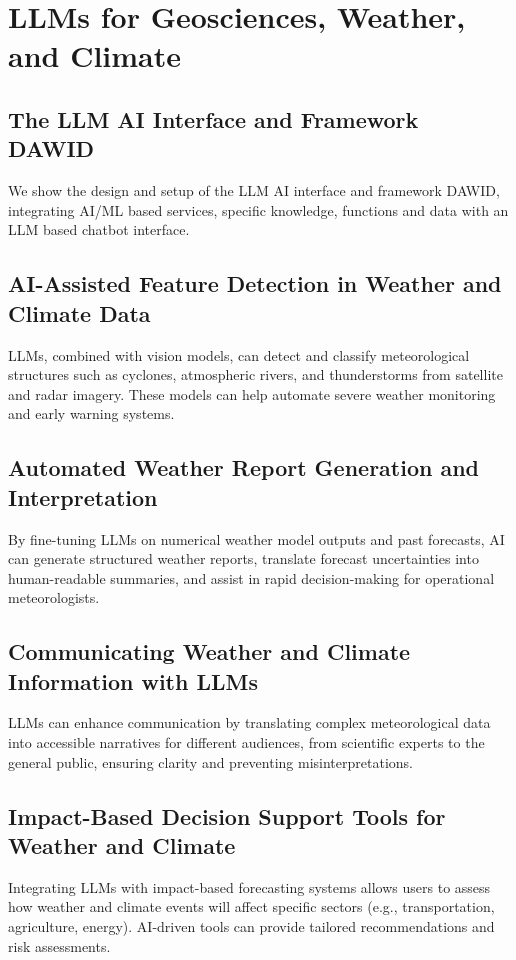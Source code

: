 \chapter{LLMs for Geosciences, Weather, and Climate }

\section{The LLM AI Interface and Framework DAWID}

We show the design and setup of the LLM AI interface and framework DAWID, integrating AI/ML based services, specific knowledge, functions and data with an LLM based chatbot interface. 

\section{AI-Assisted Feature Detection in Weather and Climate Data}

LLMs, combined with vision models, can detect and classify meteorological structures such as cyclones, atmospheric rivers, and thunderstorms from satellite and radar imagery. These models can help automate severe weather monitoring and early warning systems.

\section{Automated Weather Report Generation and Interpretation}

By fine-tuning LLMs on numerical weather model outputs and past forecasts, AI can generate structured weather reports, translate forecast uncertainties into human-readable summaries, and assist in rapid decision-making for operational meteorologists.

\section{Communicating Weather and Climate Information with LLMs}

LLMs can enhance communication by translating complex meteorological data into accessible narratives for different audiences, from scientific experts to the general public, ensuring clarity and preventing misinterpretations.

\section{Impact-Based Decision Support Tools for Weather and Climate}

Integrating LLMs with impact-based forecasting systems allows users to assess how weather and climate events will affect specific sectors (e.g., transportation, agriculture, energy). AI-driven tools can provide tailored recommendations and risk assessments.
